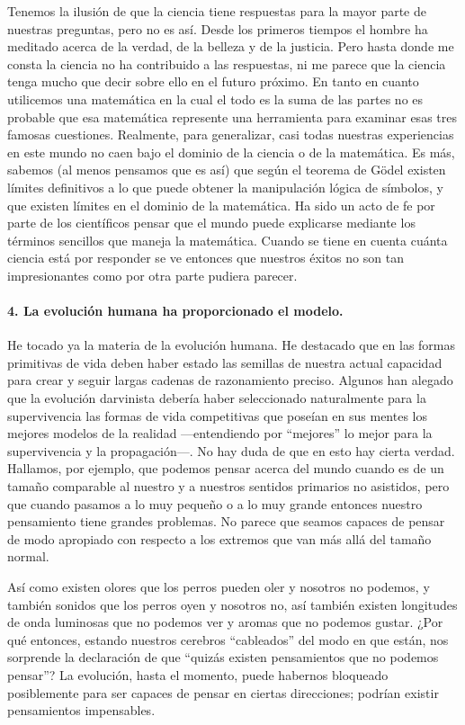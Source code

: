 \documentclass[a4paper, 12pt]{article}
\begin{document}
 Tenemos la ilusión de que la ciencia tiene respuestas para la mayor parte de nuestras preguntas, pero no es así. Desde los primeros tiempos el hombre ha meditado acerca de la verdad, de la belleza y de la justicia. Pero hasta donde me consta la ciencia no ha contribuido a las respuestas, ni me parece que la ciencia tenga mucho que decir sobre ello en el futuro próximo. En tanto en cuanto utilicemos una matemática en la cual el todo es la suma de las partes no es probable que esa matemática represente una herramienta para examinar esas tres famosas cuestiones. Realmente, para generalizar, casi todas nuestras experiencias en este mundo no caen bajo el dominio de la ciencia o de la matemática. Es más, sabemos (al menos pensamos que es así) que según el teorema de Gödel existen límites definitivos a lo que puede obtener la manipulación lógica de símbolos, y que existen límites en el dominio de la matemática. Ha sido un acto de fe por parte de los científicos pensar que el mundo puede explicarse mediante los términos sencillos que maneja la matemática. Cuando se tiene en cuenta cuánta ciencia está por responder se ve entonces que nuestros éxitos no son tan impresionantes como por otra parte pudiera parecer.

 

\paragraph*{4. La evolución humana ha proporcionado el modelo.}

 He tocado ya la materia de la evolución humana. He destacado que en las formas primitivas de vida deben haber estado las semillas de nuestra actual capacidad para crear y seguir largas cadenas de razonamiento preciso. Algunos   han alegado que la evolución darvinista debería haber seleccionado naturalmente para la supervivencia las formas de vida competitivas que poseían en sus mentes los mejores modelos de la realidad ---entendiendo por ``mejores'' lo mejor para la supervivencia y la propagación---. No hay duda de que en esto hay cierta verdad. Hallamos, por ejemplo, que podemos pensar acerca del mundo cuando es de un tamaño comparable al nuestro y a nuestros sentidos primarios no asistidos, pero que cuando pasamos a lo muy pequeño o a lo muy grande entonces nuestro pensamiento tiene grandes problemas. No parece que seamos capaces de pensar de modo apropiado con respecto a los extremos que van más allá del tamaño normal.

 

Así como existen olores que los perros pueden oler y nosotros no podemos, y también sonidos que los perros oyen y nosotros no, así también existen longitudes de onda luminosas que no podemos ver y aromas que no podemos gustar. ¿Por qué entonces, estando nuestros cerebros ``cableados'' del modo en que están, nos sorprende la declaración de que ``quizás existen pensamientos que no podemos pensar''? La evolución, hasta el momento, puede habernos bloqueado posiblemente para ser capaces de pensar en ciertas direcciones; podrían existir pensamientos impensables.
\end{document}
